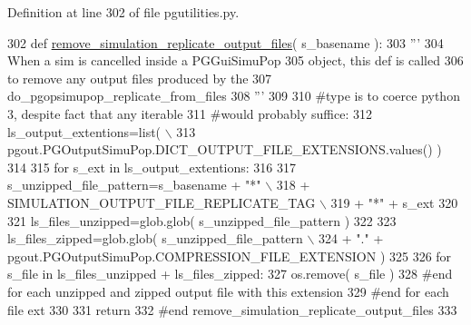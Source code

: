 Definition at line 302 of file pgutilities.\+py.


\begin{DoxyCode}
302 \textcolor{keyword}{def }\hyperlink{namespacenegui_1_1pgutilities_aa37c7d125e4eaec2eeea639f53fa140d}{remove\_simulation\_replicate\_output\_files}( s\_basename ):
303     \textcolor{stringliteral}{'''}
304 \textcolor{stringliteral}{    When a sim is cancelled inside a PGGuiSimuPop}
305 \textcolor{stringliteral}{    object, this def is called}
306 \textcolor{stringliteral}{    to remove any output files produced by the}
307 \textcolor{stringliteral}{    do\_pgopsimupop\_replicate\_from\_files}
308 \textcolor{stringliteral}{    '''}
309 
310     \textcolor{comment}{#type is to coerce python 3, despite fact that any iterable}
311     \textcolor{comment}{#would probably suffice:}
312     ls\_output\_extentions=list( \(\backslash\)
313             pgout.PGOutputSimuPop.DICT\_OUTPUT\_FILE\_EXTENSIONS.values() )
314 
315     \textcolor{keywordflow}{for} s\_ext \textcolor{keywordflow}{in} ls\_output\_extentions:
316 
317         s\_unzipped\_file\_pattern=s\_basename + \textcolor{stringliteral}{"*"} \(\backslash\)
318                 + SIMULATION\_OUTPUT\_FILE\_REPLICATE\_TAG \(\backslash\)
319                 + \textcolor{stringliteral}{"*"} + s\_ext
320 
321         ls\_files\_unzipped=glob.glob( s\_unzipped\_file\_pattern )
322 
323         ls\_files\_zipped=glob.glob( s\_unzipped\_file\_pattern \(\backslash\)
324                 + \textcolor{stringliteral}{"."} + pgout.PGOutputSimuPop.COMPRESSION\_FILE\_EXTENSION )
325 
326         \textcolor{keywordflow}{for} s\_file \textcolor{keywordflow}{in} ls\_files\_unzipped + ls\_files\_zipped:
327             os.remove( s\_file )
328         \textcolor{comment}{#end for each unzipped and zipped output file with this extension}
329     \textcolor{comment}{#end for each file ext}
330 
331     \textcolor{keywordflow}{return}
332 \textcolor{comment}{#end remove\_simulation\_replicate\_output\_files}
333 
\end{DoxyCode}
